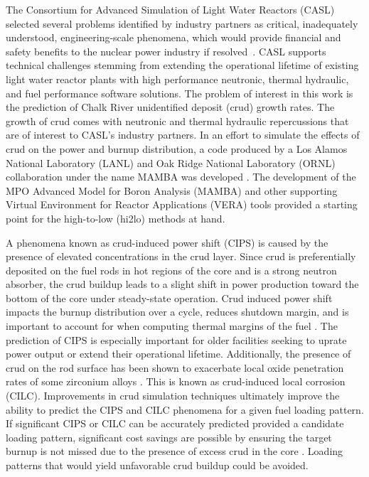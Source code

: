 
The Consortium for Advanced Simulation of Light Water Reactors (CASL) selected several problems identified by industry partners as critical, inadequately understood, engineering-scale phenomena, which would provide
financial and safety benefits to the nuclear power industry if resolved~\cite{Turinsky15}.  CASL supports technical challenges stemming from extending the operational lifetime of existing light water reactor plants with high performance neutronic, thermal hydraulic, and fuel performance software solutions.
The problem of
interest in this work is the prediction of Chalk River unidentified deposit
(crud) growth rates.  The growth of crud comes with neutronic and thermal
hydraulic repercussions that are of interest to CASL's industry partners.
In an effort to simulate the
effects of crud on the power and burnup distribution, a code produced by a Los Alamos National Laboratory (LANL)
and Oak Ridge National Laboratory (ORNL) collaboration under the name MAMBA was developed  \cite{collins16}.
The development of the MPO Advanced Model for Boron Analysis (MAMBA) and other supporting Virtual Environment for Reactor Applications (VERA) tools provided a starting point for the high-to-low (hi2lo) methods at hand.
 

A phenomena known as crud-induced power shift (CIPS) is caused by the presence
of elevated  concentrations in the crud layer.  Since crud is preferentially
deposited on the fuel rods in hot regions of the core and  is a strong neutron absorber, the crud buildup leads to a slight shift in
power production toward the bottom of the core under steady-state operation.
Crud induced power shift impacts the burnup distribution over a cycle, reduces shutdown margin,
and is important to account for when computing thermal
margins of the fuel \cite{lange2017}.  The prediction
of CIPS is especially important for older facilities seeking to uprate power
output or extend their operational lifetime.  Additionally, the presence of crud on the rod surface has been shown
to exacerbate local oxide penetration rates of some zirconium alloys \cite{adamson07}.
This is known as crud-induced local corrosion (CILC).  Improvements in crud
simulation techniques ultimately improve the ability to predict the CIPS and
CILC phenomena for a given fuel loading pattern.  If significant CIPS or CILC can be accurately predicted provided a candidate loading pattern, significant cost savings are possible by ensuring the target burnup is not missed due to the presence of excess crud in the core \cite{lange2017}.  Loading patterns that would yield unfavorable crud buildup could be avoided.
  

